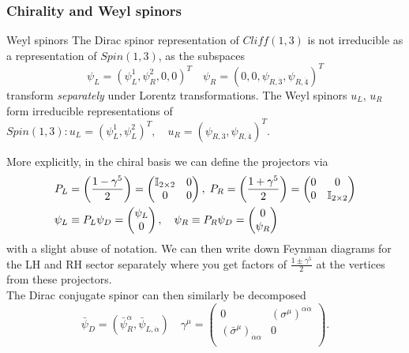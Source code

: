 \subsubsection{Chirality and Weyl spinors}
\begin{mybox}{Weyl spinors}
	The Dirac spinor representation  of $Cliff(1,3)$ is not irreducible as a representation of $Spin(1,3)$, as the subspaces 
\begin{equation}
	\psi_L = (\psi^1_L,\psi^2_R,0,0)^T \quad \psi_R = (0,0,\psi_{R,\dot{3}},\psi_{R,\dot{4}})^T
\end{equation}
transform \emph{separately} under Lorentz transformations. The Weyl spinors $u_L$, $u_R$ form irreducible representations of $Spin(1,3): u_L=(\psi^1_L,\psi^2_L)^T, \quad u_R=(\psi_{R,\dot{3}},\psi_{R,\dot{4}})^T$.\\
\end{mybox}
More explicitly, in the chiral basis we can define the projectors via
\begin{align*}
	P_L&= \left(\frac{1-\gamma^5}{2}\right)=\begin{pmatrix}
		\mathbb{I}_{2\times 2}&0 \\
		0&0\\
	\end{pmatrix},\; P_R = \left(\frac{1 +\gamma^5}{2}\right) = \begin{pmatrix}
	0&0 \\
	0&\mathbb{I}_{2\times 2}\\
\end{pmatrix}\\
\psi_L & \equiv P_L \psi_D = \begin{pmatrix}
	\psi_L\\
	0\\
\end{pmatrix},\quad 
\psi_R \equiv P_R \psi_D = \begin{pmatrix}
	0\\
	\psi_R\\
\end{pmatrix}
\end{align*}
with a slight abuse of notation. We can then write down Feynman diagrams for the LH and RH sector separately where you get factors of $\frac{1\pm \gamma^5}{2}$ at the vertices from these projectors.\\
The Dirac conjugate spinor can then similarly be decomposed
\begin{equation}
	\bar{ \psi}_D = (\bar{\psi}^\alpha_R,\bar{\psi}_{L,\dot{\alpha}} )\quad \gamma^\mu = \begin{pmatrix}
	0&(\sigma^\mu)^{\alpha \dot{\alpha}}\\
	(\bar{ \sigma}^\mu)_{\dot{\alpha}\alpha} &0\\
	\end{pmatrix}.
\end{equation}

